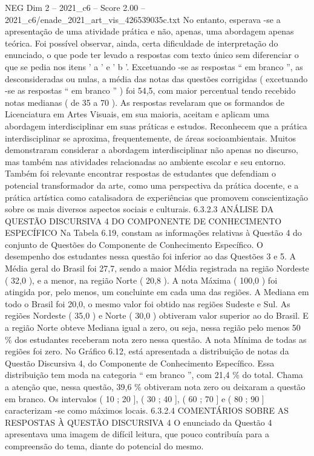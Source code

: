 \begin{textsample}{NEG Dim 2 – 2021\_c6 – Score 2.00 – 2021\_c6/enade\_2021\_art\_vis\_426539035c.txt}
No entanto, esperava -se a apresentação de uma atividade prática e não, apenas, uma abordagem apenas teórica.
Foi possível observar, ainda, certa dificuldade de interpretação do enunciado, o que pode ter levado a respostas com texto único sem diferenciar o que se pedia nos itens ' a ' e ' b '.
Excetuando -se as respostas “ em branco ”, as desconsideradas ou nulas, a média das notas das questões corrigidas ( excetuando -se as respostas “ em branco ” ) foi 54,5, com maior percentual tendo recebido notas medianas ( de 35 a 70 ).
As respostas revelaram que os formandos de Licenciatura em Artes Visuais, em sua maioria, aceitam e aplicam uma abordagem interdisciplinar em suas práticas e estudos.
Reconhecem que a prática interdisciplinar se aproxima, frequentemente, de áreas socioambientais.
Muitos demonstraram considerar a abordagem interdisciplinar não apenas no discurso, mas também nas atividades relacionadas ao ambiente escolar e seu entorno.
Também foi relevante encontrar respostas de estudantes que defendiam o potencial transformador da arte, como uma perspectiva da prática docente, e a prática artística como catalisadora de experiências que promovem conscientização sobre os mais diversos aspectos sociais e culturais. 6.3.2.3 ANÁLISE DA QUESTÃO DISCURSIVA 4 DO COMPONENTE DE CONHECIMENTO ESPECÍFICO Na Tabela 6.19, constam as informações relativas à Questão 4 do conjunto de Questões do Componente de Conhecimento Específico.
O desempenho dos estudantes nessa questão foi inferior ao das Questões 3 e 5.
A Média geral do Brasil foi 27,7, sendo a maior Média registrada na região Nordeste ( 32,0 ), e a menor, na região Norte ( 20,8 ).
A nota Máxima ( 100,0 ) foi atingida por, pelo menos, um concluinte em cada uma das regiões.
A Mediana em todo o Brasil foi 20,0, o mesmo valor foi obtido nas regiões Sudeste e Sul.
As regiões Nordeste ( 35,0 ) e Norte ( 30,0 ) obtiveram valor superior ao do Brasil.
E a região Norte obteve Mediana igual a zero, ou seja, nessa região pelo menos 50 \% dos estudantes receberam nota zero nessa questão.
A nota Mínima de todas as regiões foi zero.
No Gráfico 6.12, está apresentada a distribuição de notas da Questão Discursiva 4, do Componente de Conhecimento Específico.
Essa distribuição tem moda na categoria “ em branco ”, com 21,4 \% do total.
Chama a atenção que, nessa questão, 39,6 \% obtiveram nota zero ou deixaram a questão em branco.
Os intervalos ( 10 ; 20 ], ( 30 ; 40 ], ( 60 ; 70 ] e ( 80 ; 90 ] caracterizam -se como máximos locais. 6.3.2.4 COMENTÁRIOS SOBRE AS RESPOSTAS À QUESTÃO DISCURSIVA 4 O enunciado da Questão 4 apresentava uma imagem de difícil leitura, que pouco contribuía para a compreensão do tema, diante do potencial do mesmo.

\end{textsample}
